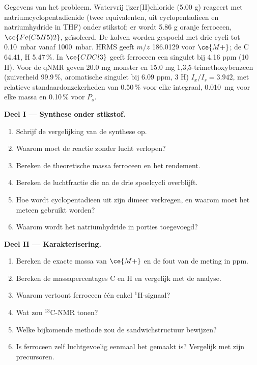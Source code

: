 \begin{problem}
\label{pb:b3:lab-techniques-3:1}
Gegevens van het probleem. Watervrij ijzer(II)chloride (5.00 g) reageert
met natriumcyclopentadienide (twee equivalenten, uit cyclopentadieen en
natriumhydride in THF) onder stikstof; er wordt 5.86 g oranje ferroceen, $\ce{Fe(C5H5)2}$, geïsoleerd. De kolven
worden gespoeld met drie cycli tot \qty{0.10}{mbar} vanaf \qty{1000}{mbar}. HRMS geeft $m/z$ 186.0129 voor $\ce{M+}$; de
 C 64.41, H 5.47\,\%. In $\ce{CDCl3}$ geeft ferroceen een singulet bij 4.16 ppm (10 H). Voor de qNMR
geven 20.0 mg monster en 15.0 mg 1,3,5-trimethoxybenzeen (zuiverheid 99.9\,\%, aromatische
singulet bij 6.09 ppm, 3 H) $I_x/I_s = 3.942$, met relatieve standaardonzekerheden van 0.50\,\% voor elke
integraal, \qty{0.010}{mg} voor elke massa en 0.10\,\% voor $P_s$.

\medskip\noindent\textbf{Deel I --- Synthese onder stikstof.}
\begin{enumerate}
  \item Schrijf de vergelijking van de synthese op.
  \item Waarom moet de reactie zonder lucht verlopen?
  \item Bereken de theoretische massa ferroceen en het rendement.
  \item Bereken de luchtfractie die na de drie spoelcycli overblijft.
  \item Hoe wordt cyclopentadieen uit zijn dimeer verkregen, en waarom
        moet het meteen gebruikt worden?
  \item Waarom wordt het natriumhydride in porties toegevoegd?
\end{enumerate}

\medskip\noindent\textbf{Deel II --- Karakterisering.}
\begin{enumerate}[resume]
  \item Bereken de exacte massa van $\ce{M+}$ en de fout van de meting in ppm.
  \item Bereken de massapercentages C en H en vergelijk met de analyse.
  \item Waarom vertoont ferroceen één enkel $^1$H-signaal?
  \item Wat zou $^{13}$C-NMR tonen?
  \item Welke bijkomende methode zou de sandwichstructuur bewijzen?
  \item Is ferroceen zelf luchtgevoelig eenmaal het gemaakt is? Vergelijk
        met zijn precursoren.
\end{enumerate}


\end{problem}

